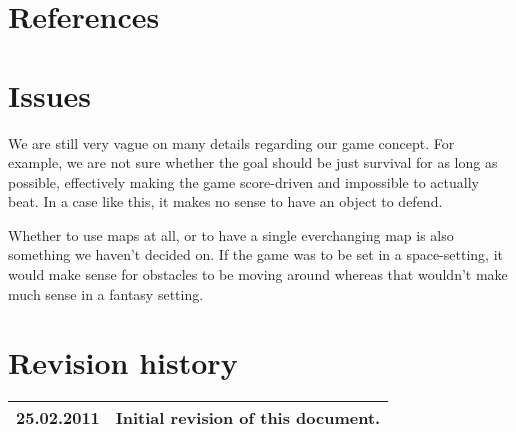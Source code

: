 \documentclass[titlepage,a4paper,11pt]{article}
\begin{document}
\section{References}

\section{Issues}
We are still very vague on many details regarding our game concept. For example,
we are not sure whether the goal should be just survival for as long as possible,
effectively making the game score-driven and impossible to actually beat. In a
case like this, it makes no sense to have an object to defend.

Whether to use maps at all, or to have a single everchanging map is also something
we haven't decided on. If the game was to be set in a space-setting, it would
make sense for obstacles to be moving around whereas that wouldn't make much sense
in a fantasy setting. 

\section{Revision history}

\begin{table}[H]
  \begin{tabular}{| c | c |}
    \hline
    25.02.2011 & Initial revision of this document. \\
    \hline
  \end{tabular}
\end{table}
\end{document}
